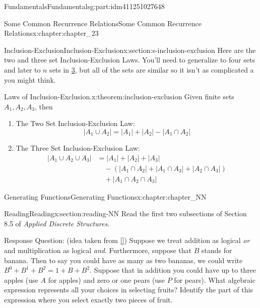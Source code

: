 \documentclass[oneside,10pt,]{book}
\newcommand{\xreffont}{\relax}
\numberwithin{equation}{section}
\begin{document}
\begin{partptx}{Fundamentals}{}{Fundamentals}{}{}{g:part:idm411251027648}
\begin{chapterptx}{Some Common Recurrence Relations}{}{Some Common Recurrence Relations}{}{}{x:chapter:chapter_23}
\begin{sectionptx}{Inclusion-Exclusion}{}{Inclusion-Exclusion}{}{}{x:section:s-inclusion-exclusion}
Here are the two and three set Inclusion-Exclusion Laws. You'll need to generalize to four sets and later to \(n\) sets in \hyperlink{x:li:p3}{3}, but all of the sets are similar so it isn't as complicated a you might think.%
\begin{theorem}{Laws of Inclusion-Exclusion.}{}{x:theorem:inclusion-exclusion}%
%
Given finite sets \(A_1, A_2, A_3\), then%
\begin{enumerate}[label=(\alph*)]
\item\hypertarget{x:li:ie2}{}The Two Set Inclusion-Exclusion Law:%
\begin{equation*}
\lvert A_1 \cup A_2 \rvert =\lvert A_1 \rvert + \lvert A_2 \rvert - \lvert A_1 \cap A_2 \rvert  
\end{equation*}
%
\item\hypertarget{x:li:ie3}{}The Three Set Inclusion-Exclusion Law:%
\begin{equation*}
\begin{split}
\lvert A_1 \cup A_2 \cup A_3 \rvert & =\lvert A_1 \rvert + \lvert A_2 \rvert + \lvert A_3 \rvert\\
&\quad - (\lvert A_1 \cap A_2 \rvert + \lvert A_1 \cap A_3 \rvert+ \lvert A_2 \cap A_3 \rvert)\\
&\quad + \lvert A_1 \cap A_2 \cap A_3 \rvert
\end{split} 
\end{equation*}
%
\end{enumerate}
%
\end{theorem}
\end{sectionptx}
\end{chapterptx}
%
\typeout{************************************************}
\typeout{************************************************}
%
\begin{chapterptx}{Generating Functions}{}{Generating Functions}{}{}{x:chapter:chapter_NN}
\index{}%
%
%
\typeout{************************************************}
\typeout{************************************************}
%
\begin{sectionptx}{Reading}{}{Reading}{}{}{x:section:reading-NN}
Read the first two subsections of Section 8.5 of \emph{Applied Discrete Structures}.%
\par
Response Question: (idea taken from \hyperlink{x:biblio:biblio-bogart-2017}{[{\xreffont 1}]}) Suppose we treat addition as logical \emph{or} and multiplication as logical \emph{and}.  Furthermore, suppose that \(B\) stands for banana.  Then to say you could have as many as two bananas, we could write \(B^0+B^1+B^2=1+B+B^2\).  Suppose that in addition you could have up to three apples (use \(A\) for apples) and zero or one pears (use \(P\) for pears).  What algebraic expression represents all your choices in selecting fruits?  Identify the part of this expression where you select exactly two pieces of fruit.%

\end{sectionptx}
\end{chapterptx}
\end{partptx}
\end{document}
